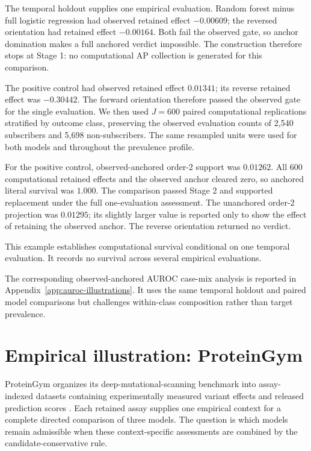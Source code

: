 \documentclass[11pt]{article}
\theoremstyle{remark}
\begin{document}
The temporal holdout supplies one empirical evaluation. Random forest minus full
logistic regression had observed retained effect $-0.00609$; the reversed
orientation had retained effect $-0.00164$. Both fail the observed gate, so
anchor domination makes a full anchored verdict impossible. The construction
therefore stops at Stage 1: no computational AP collection is generated for
this comparison.

The positive control had observed retained effect $0.01341$; its reverse
retained effect was $-0.30442$. The forward orientation therefore passed the
observed gate for the single evaluation. We then used
$J=600$ paired computational replications stratified by outcome class, preserving the
observed evaluation counts of 2,540 subscribers and 5,698 non-subscribers. The
same resampled units were used for both models and throughout the prevalence
profile.

For the positive control, observed-anchored order-2 support was $0.01262$.
All 600 computational retained effects and the observed anchor cleared zero,
so anchored literal survival was $1.000$. The comparison passed Stage 2 and
supported replacement under the full one-evaluation assessment. The
unanchored order-2 projection was $0.01295$; its slightly larger value is
reported only to show the effect of retaining the observed anchor. The reverse
orientation returned no verdict.

This example establishes computational survival conditional on one temporal
evaluation. It records no survival across several empirical evaluations.

The corresponding observed-anchored AUROC case-mix analysis is reported in
Appendix~\ref{app:auroc-illustrations}. It uses the same temporal holdout and
paired model comparisons but challenges within-class composition rather than
target prevalence.

\section{Empirical illustration: ProteinGym}
\label{sec:proteingym-contexts}

ProteinGym organizes its deep-mutational-scanning benchmark into
assay-indexed datasets containing experimentally measured variant effects
and released prediction scores \cite{notin2023proteingym}. Each retained
assay supplies one empirical context for a complete directed comparison of
three models. The question is which models remain admissible when these
context-specific assessments are combined by the candidate-conservative rule.
\end{document}
